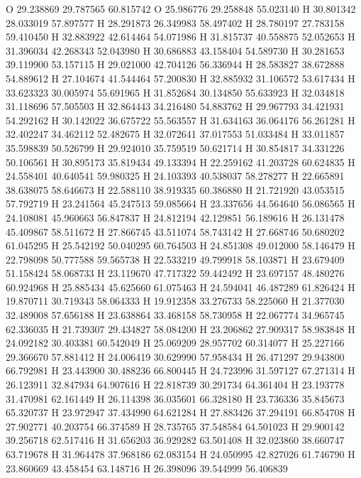 \documentclass{article}
\begin{document}
O 29.238869 29.787565 60.815742 
O 25.986776 29.258848 55.023140 
H 30.801342 28.033019 57.897577 
H 28.291873 26.349983 58.497402 
H 28.780197 27.783158 59.410450 
H 32.883922 42.614464 54.071986 
H 31.815737 40.558875 52.052653 
H 31.396034 42.268343 52.043980 
H 30.686883 43.158404 54.589730 
H 30.281653 39.119900 53.157115 
H 29.021000 42.704126 56.336944 
H 28.583827 38.672888 54.889612 
H 27.104674 41.544464 57.200830 
H 32.885932 31.106572 53.617434 
H 33.623323 30.005974 55.691965 
H 31.852684 30.134850 55.633923 
H 32.034818 31.118696 57.505503 
H 32.864443 34.216480 54.883762 
H 29.967793 34.421931 54.292162 
H 30.142022 36.675722 55.563557 
H 31.634163 36.064176 56.261281 
H 32.402247 34.462112 52.482675 
H 32.072641 37.017553 51.033484 
H 33.011857 35.598839 50.526799 
H 29.924010 35.759519 50.621714 
H 30.854817 34.331226 50.106561 
H 30.895173 35.819434 49.133394 
H 22.259162 41.203728 60.624835 
H 24.558401 40.640541 59.980325 
H 24.103393 40.538037 58.278277 
H 22.665891 38.638075 58.646673 
H 22.588110 38.919335 60.386880 
H 21.721920 43.053515 57.792719 
H 23.241564 45.247513 59.085664 
H 23.337656 44.564640 56.086565 
H 24.108081 45.960663 56.847837 
H 24.812194 42.129851 56.189616 
H 26.131478 45.409867 58.511672 
H 27.866745 43.511074 58.743142 
H 27.668746 50.680202 61.045295 
H 25.542192 50.040295 60.764503 
H 24.851308 49.012000 58.146479 
H 22.798098 50.777588 59.565738 
H 22.533219 49.799918 58.103871 
H 23.679409 51.158424 58.068733 
H 23.119670 47.717322 59.442492 
H 23.697157 48.480276 60.924968 
H 25.885434 45.625660 61.075463 
H 24.594041 46.487289 61.826424 
H 19.870711 30.719343 58.064333 
H 19.912358 33.276733 58.225060 
H 21.377030 32.489008 57.656188 
H 23.638864 33.468158 58.730958 
H 22.067774 34.965745 62.336035 
H 21.739307 29.434827 58.084200 
H 23.206862 27.909317 58.983848 
H 24.092182 30.403381 60.542049 
H 25.069209 28.957702 60.314077 
H 25.227166 29.366670 57.881412 
H 24.006419 30.629990 57.958434 
H 26.471297 29.943800 66.792981 
H 23.443900 30.488236 66.800445 
H 24.723996 31.597127 67.271314 
H 26.123911 32.847934 64.907616 
H 22.818739 30.291734 64.361404 
H 23.193778 31.470981 62.161449 
H 26.114398 36.035601 66.328180 
H 23.736336 35.845673 65.320737 
H 23.972947 37.434990 64.621284 
H 27.883426 37.294191 66.854708 
H 27.902771 40.203754 66.374589 
H 28.735765 37.548584 64.501023 
H 29.900142 39.256718 62.517416 
H 31.656203 36.929282 63.501408 
H 32.023860 38.660747 63.719678 
H 31.964478 37.968186 62.083154 
H 24.050995 42.827026 61.746790 
H 23.860669 43.458454 63.148716 
H 26.398096 39.544999 56.406839 
\end{document}
